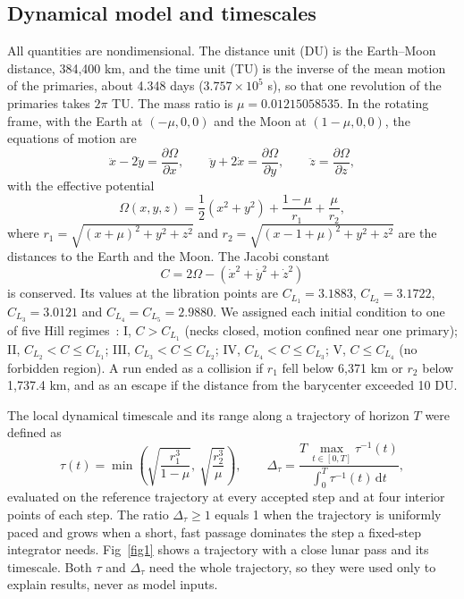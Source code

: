 \documentclass[10pt,letterpaper]{article}
\newcommand{\dd}{\mathrm{d}}
\begin{document}
\subsection*{Dynamical model and timescales}
All quantities are nondimensional. The distance unit (DU) is the Earth--Moon distance, 384,400 km, and the time unit (TU) is the inverse of the mean motion of the primaries, about 4.348 days ($3.757\times10^{5}$ s), so that one revolution of the primaries takes $2\pi$ TU. The mass ratio is $\mu = 0.01215058535$. In the rotating frame, with the Earth at $(-\mu,0,0)$ and the Moon at $(1-\mu,0,0)$, the equations of motion are~\cite{szebehely1967}
\begin{equation}
\label{eq:eom}
\ddot{x} - 2\dot{y} = \frac{\partial \Omega}{\partial x}, \qquad
\ddot{y} + 2\dot{x} = \frac{\partial \Omega}{\partial y}, \qquad
\ddot{z} = \frac{\partial \Omega}{\partial z},
\end{equation}
with the effective potential
\begin{equation}
\label{eq:omega}
\Omega(x,y,z) = \frac{1}{2}\left(x^{2}+y^{2}\right) + \frac{1-\mu}{r_{1}} + \frac{\mu}{r_{2}},
\end{equation}
where $r_{1} = \sqrt{(x+\mu)^{2}+y^{2}+z^{2}}$ and $r_{2} = \sqrt{(x-1+\mu)^{2}+y^{2}+z^{2}}$ are the distances to the Earth and the Moon. The Jacobi constant
\begin{equation}
\label{eq:jacobi}
C = 2\Omega - \left(\dot{x}^{2}+\dot{y}^{2}+\dot{z}^{2}\right)
\end{equation}
is conserved. Its values at the libration points are $C_{L_1} = 3.1883$, $C_{L_2} = 3.1722$, $C_{L_3} = 3.0121$ and $C_{L_4} = C_{L_5} = 2.9880$. We assigned each initial condition to one of five Hill regimes~\cite{koon2011}: I, $C > C_{L_1}$ (necks closed, motion confined near one primary); II, $C_{L_2} < C \le C_{L_1}$; III, $C_{L_3} < C \le C_{L_2}$; IV, $C_{L_4} < C \le C_{L_3}$; V, $C \le C_{L_4}$ (no forbidden region). A run ended as a collision if $r_{1}$ fell below 6,371 km or $r_{2}$ below 1,737.4 km, and as an escape if the distance from the barycenter exceeded 10 DU.

The local dynamical timescale and its range along a trajectory of horizon $T$ were defined as
\begin{equation}
\label{eq:tau}
\tau(t) = \min\left(\sqrt{\frac{r_{1}^{3}}{1-\mu}},\ \sqrt{\frac{r_{2}^{3}}{\mu}}\right), \qquad
\Delta_{\tau} = \frac{T\,\max_{t\in[0,T]}\tau^{-1}(t)}{\int_{0}^{T}\tau^{-1}(t)\,\dd t},
\end{equation}
evaluated on the reference trajectory at every accepted step and at four interior points of each step. The ratio $\Delta_{\tau} \ge 1$ equals 1 when the trajectory is uniformly paced and grows when a short, fast passage dominates the step a fixed-step integrator needs. Fig~\ref{fig1} shows a trajectory with a close lunar pass and its timescale. Both $\tau$ and $\Delta_{\tau}$ need the whole trajectory, so they were used only to explain results, never as model inputs.
\end{document}
